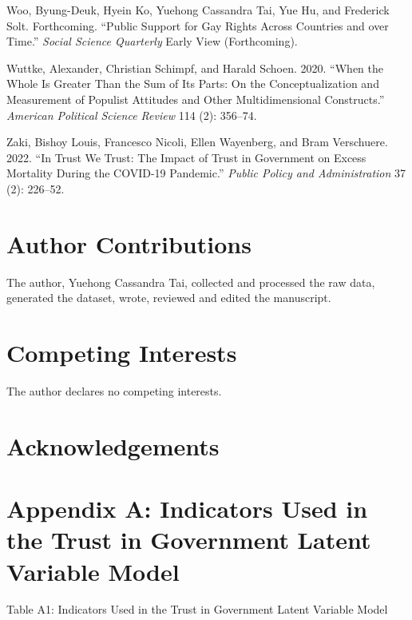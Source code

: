 \documentclass[
  12pt,
]{article}
\newlength{\cslhangindent}
\newenvironment{CSLReferences}[2] %
 {\begin{list}{}{%
  \setlength{\itemindent}{0pt}
  \setlength{\leftmargin}{0pt}
  \setlength{\parsep}{0pt}
  \ifodd #1
   \setlength{\leftmargin}{\cslhangindent}
   \setlength{\itemindent}{-1\cslhangindent}
  \fi
  \setlength{\itemsep}{#2\baselineskip}}}
 {\end{list}}
\begin{document}
\begin{CSLReferences}{1}{0}
Woo, Byung-Deuk, Hyein Ko, Yuehong Cassandra Tai, Yue Hu, and Frederick Solt. Forthcoming. {``Public Support for Gay Rights Across Countries and over Time.''} \emph{Social Science Quarterly} Early View (Forthcoming).

Wuttke, Alexander, Christian Schimpf, and Harald Schoen. 2020. {``When the Whole Is Greater Than the Sum of Its Parts: On the Conceptualization and Measurement of Populist Attitudes and Other Multidimensional Constructs.''} \emph{American Political Science Review} 114 (2): 356--74.

Zaki, Bishoy Louis, Francesco Nicoli, Ellen Wayenberg, and Bram Verschuere. 2022. {``In Trust We Trust: The Impact of Trust in Government on Excess Mortality During the COVID-19 Pandemic.''} \emph{Public Policy and Administration} 37 (2): 226--52.

\end{CSLReferences}

\section{Author Contributions}\label{author-contributions}

The author, Yuehong Cassandra Tai, collected and processed the raw data, generated the dataset, wrote, reviewed and edited the manuscript.

\section{Competing Interests}\label{competing-interests}

The author declares no competing interests.

\section{Acknowledgements}\label{acknowledgements}

\pagebreak

\section{Appendix A: Indicators Used in the Trust in Government Latent Variable Model}\label{appendix-a-indicators-used-in-the-trust-in-government-latent-variable-model}

\noindent Table A1: Indicators Used in the Trust in Government Latent Variable Model
\end{document}
